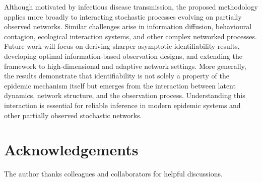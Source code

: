 \documentclass[10pt]{article}
\begin{document}
Although motivated by infectious disease transmission, the proposed methodology applies more broadly to interacting stochastic processes evolving on partially observed networks. Similar challenges arise in information diffusion, behavioural contagion, ecological interaction systems, and other complex networked processes. Future work will focus on deriving sharper asymptotic identifiability results, developing optimal information-based observation designs, and extending the framework to high-dimensional and adaptive network settings. More generally, the results demonstrate that identifiability is not solely a property of the epidemic mechanism itself but emerges from the interaction between latent dynamics, network structure, and the observation process. Understanding this interaction is essential for reliable inference in modern epidemic systems and other partially observed stochastic networks.


\section*{Acknowledgements}
The author thanks colleagues and collaborators for helpful discussions.



\end{document}
